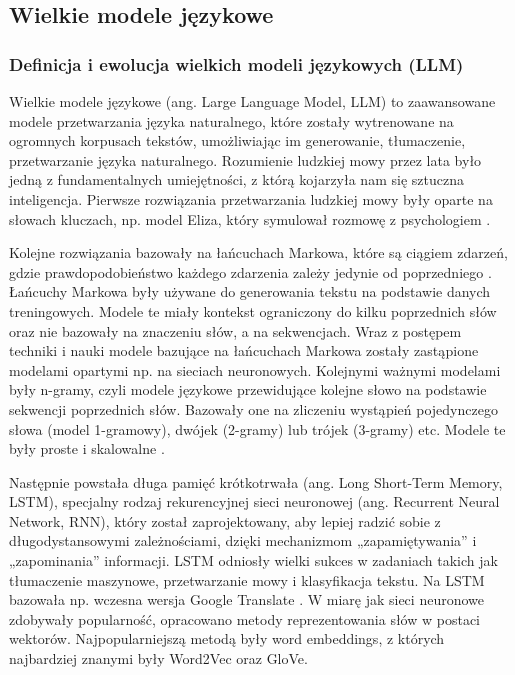 \documentclass[
a4paper,
12pt,
]{article}
\begin{document}
\subsection{Wielkie modele językowe}

\subsubsection{Definicja i ewolucja wielkich modeli językowych (LLM)}

Wielkie modele językowe (ang. Large Language Model, LLM) to zaawansowane modele przetwarzania języka naturalnego, które zostały wytrenowane na ogromnych korpusach tekstów, umożliwiając im generowanie, tłumaczenie, przetwarzanie języka naturalnego. Rozumienie ludzkiej mowy przez lata było jedną z fundamentalnych umiejętności, z którą kojarzyła nam się sztuczna inteligencja. Pierwsze rozwiązania przetwarzania ludzkiej mowy były oparte na słowach kluczach, np. model Eliza, który symulował rozmowę z psychologiem \cite{elize}. 

Kolejne rozwiązania bazowały na łańcuchach Markowa, które są ciągiem zdarzeń, gdzie prawdopodobieństwo każdego zdarzenia zależy jedynie od poprzedniego \cite{lancuchy_markowa}. Łańcuchy Markowa były używane do generowania tekstu na podstawie danych treningowych. Modele te miały kontekst ograniczony do kilku poprzednich słów
oraz
nie bazowały na znaczeniu słów, a na sekwencjach. Wraz z postępem techniki i nauki modele bazujące na łańcuchach Markowa zostały zastąpione modelami opartymi np. na sieciach neuronowych. Kolejnymi ważnymi modelami były n-gramy, czyli modele językowe przewidujące kolejne słowo na podstawie sekwencji poprzednich słów. Bazowały one na zliczeniu wystąpień pojedynczego słowa (model 1-gramowy), dwójek (2-gramy) lub trójek (3-gramy) etc. 
Modele te były proste i skalowalne \cite{n_gram}. 

Następnie powstała długa pamięć krótkotrwała (ang. Long Short-Term Memory, LSTM), specjalny rodzaj rekurencyjnej sieci neuronowej (ang. Recurrent Neural Network, RNN), który został zaprojektowany, aby lepiej radzić sobie z długodystansowymi zależnościami, dzięki mechanizmom „zapamiętywania” i „zapominania” informacji. LSTM odniosły wielki sukces w zadaniach takich jak tłumaczenie maszynowe, przetwarzanie mowy i klasyfikacja tekstu. Na LSTM bazowała np. wczesna wersja Google Translate \cite{googletranslate}. W miarę jak sieci neuronowe zdobywały popularność, opracowano metody reprezentowania słów w postaci wektorów. Najpopularniejszą metodą były word embeddings, z których najbardziej znanymi były Word2Vec oraz GloVe.
\end{document}
